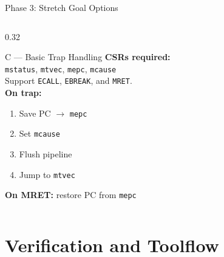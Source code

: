 \documentclass[aspectratio=169,10pt]{beamer}
\begin{document}
\begin{frame}{Phase 3: Stretch Goal Options}
\begin{columns}[T]
    \begin{column}{0.32\textwidth}
      \begin{block}{C --- Basic Trap Handling}
        \textbf{CSRs required:}\\
        \texttt{mstatus}, \texttt{mtvec}, \texttt{mepc}, \texttt{mcause}\\[0.4em]
        Support \texttt{ECALL}, \texttt{EBREAK}, and \texttt{MRET}.\\[0.4em]
        \textbf{On trap:}
        \begin{enumerate}\scriptsize
          \item Save PC $\to$ \texttt{mepc}
          \item Set \texttt{mcause}
          \item Flush pipeline
          \item Jump to \texttt{mtvec}
        \end{enumerate}
        \textbf{On MRET:} restore PC from \texttt{mepc}
      \end{block}
    \end{column}
  \end{columns}
\end{frame}

\section{Verification and Toolflow}
\end{document}
